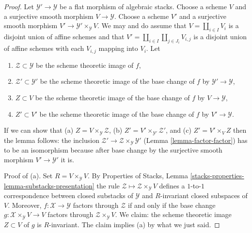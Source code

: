 \documentclass[10pt,a4paper]{amsart}
\theoremstyle{plain}
\theoremstyle{definition}
\theoremstyle{remark}
\numberwithin{equation}{subsection}
\begin{document}
\begin{proof}
Let $\mathcal{Y}' \to \mathcal{Y}$ be a flat morphism of algebraic stacks.
Choose a scheme $V$ and a surjective smooth morphism $V \to \mathcal{Y}$.
Choose a scheme $V'$ and a
surjective smooth morphism $V' \to \mathcal{Y}' \times_\mathcal{Y} V$.
We may and do assume that $V = \coprod_{i \in I} V_i$ is a disjoint
union of affine schemes and that
$V' = \coprod_{i \in I} \coprod_{j \in J_i} V_{i, j}$
is a disjoint union of affine schemes with each $V_{i, j}$ mapping into $V_i$.
Let
\begin{enumerate}
\item $\mathcal{Z} \subset \mathcal{Y}$ be the scheme theoretic image of $f$,
\item $\mathcal{Z}' \subset \mathcal{Y}'$ be the scheme theoretic image
of the base change of $f$ by $\mathcal{Y}' \to \mathcal{Y}$,
\item $Z \subset V$ be the scheme theoretic image
of the base change of $f$ by $V \to \mathcal{Y}$,
\item $Z' \subset V'$ be the scheme theoretic image
of the base change of $f$ by $V' \to \mathcal{Y}$.
\end{enumerate}
If we can show that
(a) $Z = V \times_\mathcal{Y} \mathcal{Z}$,
(b) $Z' = V' \times_{\mathcal{Y}'} \mathcal{Z}'$, and
(c) $Z' = V' \times_V Z$
then the lemma follows: the inclusion
$\mathcal{Z}' \to \mathcal{Z} \times_\mathcal{Y} \mathcal{Y}'$
(Lemma \ref{lemma-factor-factor})
has to be an isomorphism because after base change by the surjective
smooth morphism $V' \to \mathcal{Y}'$ it is.

\medskip\noindent
Proof of (a). Set $R = V \times_\mathcal{Y} V$.
By Properties of Stacks, Lemma
\ref{stacks-properties-lemma-substacks-presentation}
the rule $\mathcal{Z} \mapsto \mathcal{Z} \times_\mathcal{Y} V$
defines a $1$-to-$1$ correspondence between closed substacks
of $\mathcal{Y}$ and $R$-invariant closed subspaces of $V$.
Moreover, $f : \mathcal{X} \to \mathcal{Y}$ factors through $\mathcal{Z}$
if and only if the base change
$g : \mathcal{X} \times_\mathcal{Y} V \to V$ factors through
$\mathcal{Z} \times_\mathcal{Y} V$.
We claim: the scheme theoretic image $Z \subset V$ of $g$
is $R$-invariant. The claim implies (a) by what we just said.


\end{proof}
\end{document}
